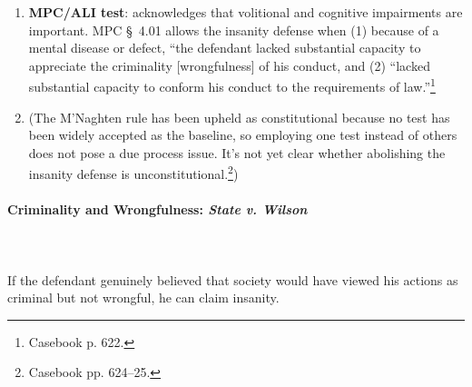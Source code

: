 \begin{enumerate}
    \item \textbf{MPC/ALI test}: acknowledges that volitional and cognitive 
    impairments are important. MPC \S\ 4.01 allows the insanity defense when 
    (1) because of a mental disease or defect, ``the defendant lacked 
    substantial capacity to appreciate the criminality [wrongfulness] of his 
    conduct, and (2) ``lacked substantial capacity to conform his conduct to 
    the requirements of law.''\footnote{Casebook p. 622.}
    \item (The M'Naghten rule has been upheld as constitutional because no 
    test has been widely accepted as the baseline, so employing one test 
    instead of others does not pose a due process issue. It's not yet clear 
    whether abolishing the insanity defense is 
    unconstitutional.\footnote{Casebook pp. 624--25.})
\end{enumerate}

\paragraph{Criminality and Wrongfulness: \emph{State v. Wilson}}
~\\\\
If the defendant genuinely believed that society would have viewed his actions 
as criminal but not wrongful, he can claim insanity.

